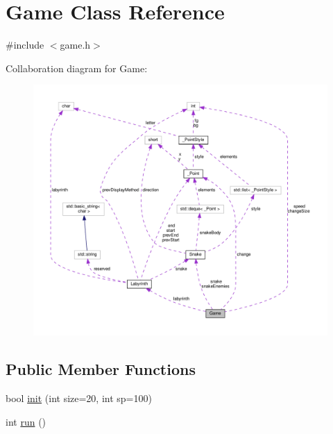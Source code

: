 \hypertarget{class_game}{}\section{Game Class Reference}
\label{class_game}


{\ttfamily \#include $<$game.\+h$>$}



Collaboration diagram for Game\+:
\nopagebreak
\begin{figure}[H]
\begin{center}
\leavevmode
\includegraphics[width=350pt]{class_game__coll__graph}
\end{center}
\end{figure}
\subsection*{Public Member Functions}
\begin{DoxyCompactItemize}
\item 
bool \mbox{\hyperlink{class_game_a66e1800ff072c0b4e737ac51430630db}{init}} (int size=20, int sp=100)
\item 
int \mbox{\hyperlink{class_game_a99fb161fbbe87d25a8b73265a0611e58}{run}} ()
\end{DoxyCompactItemize}

